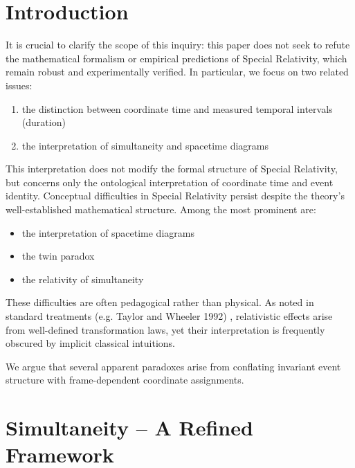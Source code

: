 \documentclass[a4paper,fleqn]{cas-sc}
\begin{document}
\maketitle

\section{Introduction}\label{sec1}
It is crucial to clarify the scope of this inquiry: this paper does not seek to refute the mathematical formalism or empirical predictions of Special Relativity, which remain robust and experimentally verified. In particular, we focus on two related issues:
	\begin{enumerate}
		\item the distinction between coordinate time and measured temporal intervals (duration)
		\item the interpretation of simultaneity and spacetime diagrams
	\end{enumerate}

This interpretation does not modify the formal structure of Special Relativity, but concerns only the ontological interpretation of coordinate time and event identity. Conceptual difficulties in Special Relativity persist despite the theory’s well-established mathematical structure. Among the most prominent are:
	\begin{itemize}
		\item the interpretation of spacetime diagrams
		\item the twin paradox
		\item the relativity of simultaneity
	\end{itemize}
These difficulties are often pedagogical rather than physical. As noted in standard treatments (e.g. Taylor and Wheeler 1992) \cite{taylor1992, french1968}, relativistic effects arise from well-defined transformation laws, yet their interpretation is frequently obscured by implicit classical intuitions.

We argue that several apparent paradoxes arise from conflating invariant event structure with frame-dependent coordinate assignments.
\section{Simultaneity – A Refined Framework}\label{sec2}
\end{document}
